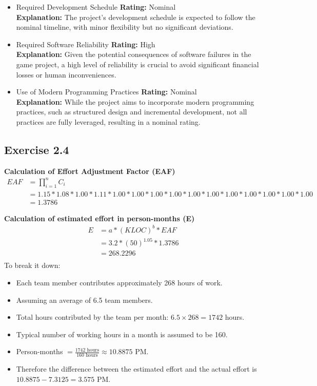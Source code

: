 \documentclass[a4paper]{scrartcl}
\begin{document}
  \begin{itemize}
    \item Required Development Schedule
    \textbf{Rating:} Nominal \\
    \textbf{Explanation:} The project's development schedule is expected to follow the nominal timeline, with minor flexibility but no significant deviations.
    
    \item Required Software Reliability
    \textbf{Rating:} High \\
    \textbf{Explanation:} Given the potential consequences of software failures in the game project, a high level of reliability is crucial to avoid significant financial losses or human inconveniences.
    
    \item Use of Modern Programming Practices
    \textbf{Rating:} Nominal \\
    \textbf{Explanation:} While the project aims to incorporate modern programming practices, such as structured design and incremental development, not all practices are fully leveraged, resulting in a nominal rating.
  \end{itemize}

\subsection*{Exercise 2.4}
\textbf{Calculation of Effort Adjustment Factor (EAF)}
\begin{align*}
  EAF &= \prod_{i=1}^{n} C_i \\
  &= 1.15 * 1.08 * 1.00 * 1.11 * 1.00 * 1.00 * 1.00 * 1.00 * 1.00 * 1.00 * 1.00 * 1.00 * 1.00 * 1.00 * 1.00 \\
  &= 1.3786
  \end{align*}

\textbf{Calculation of estimated effort in person-months (E)}
\begin{align*}
  E &= a * (KLOC)^b * EAF \\
  &= 3.2 * (50)^{1.05} * 1.3786 \\
  &=  268.2296 \\
\end{align*}
To break it down: 
\begin{itemize}
  \item Each team member contributes approximately 268 hours of work.
  \item Assuming an average of 6.5 team members.
  \item Total hours contributed by the team per month: $6.5 \times 268 = 1742$ hours.
  \item Typical number of working hours in a month is assumed to be 160.
  \item Person-months $= \frac{1742 \text{ hours}}{160 \text{ hours}} \approx 10.8875 \text{ PM}$.
  \item Therefore the difference between the estimated effort and the actual effort is $10.8875 - 7.3125 = 3.575$ PM.
\end{itemize}
\end{document}
